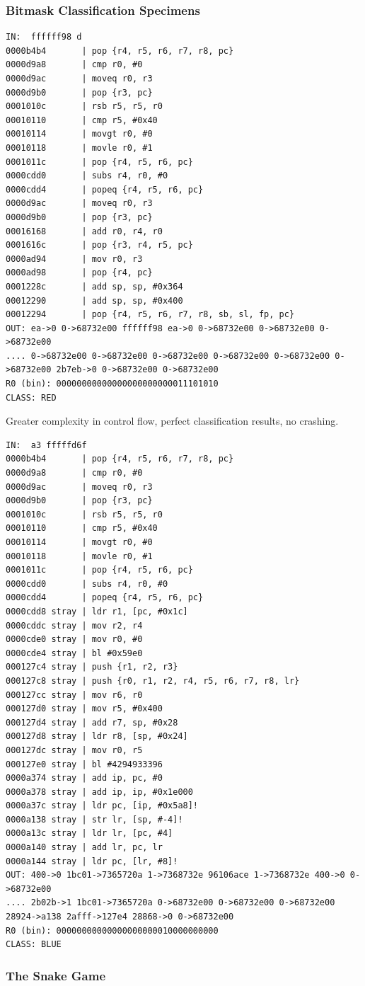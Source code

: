 \documentclass[11pt]{article}
\begin{document}
\subsubsection*{Bitmask Classification Specimens}
\label{sec:orgcdf7ec4}
\begin{verbatim}
IN:  ffffff98 d
0000b4b4       | pop {r4, r5, r6, r7, r8, pc}
0000d9a8       | cmp r0, #0
0000d9ac       | moveq r0, r3
0000d9b0       | pop {r3, pc}
0001010c       | rsb r5, r5, r0
00010110       | cmp r5, #0x40
00010114       | movgt r0, #0
00010118       | movle r0, #1
0001011c       | pop {r4, r5, r6, pc}
0000cdd0       | subs r4, r0, #0
0000cdd4       | popeq {r4, r5, r6, pc}
0000d9ac       | moveq r0, r3
0000d9b0       | pop {r3, pc}
00016168       | add r0, r4, r0
0001616c       | pop {r3, r4, r5, pc}
0000ad94       | mov r0, r3
0000ad98       | pop {r4, pc}
0001228c       | add sp, sp, #0x364
00012290       | add sp, sp, #0x400
00012294       | pop {r4, r5, r6, r7, r8, sb, sl, fp, pc}
OUT: ea->0 0->68732e00 ffffff98 ea->0 0->68732e00 0->68732e00 0->68732e00 
.... 0->68732e00 0->68732e00 0->68732e00 0->68732e00 0->68732e00 0->68732e00 2b7eb->0 0->68732e00 0->68732e00 
R0 (bin): 00000000000000000000000011101010
CLASS: RED
\end{verbatim}
Greater complexity in control flow, perfect classification results, no crashing.
\begin{verbatim}
IN:  a3 fffffd6f
0000b4b4       | pop {r4, r5, r6, r7, r8, pc}
0000d9a8       | cmp r0, #0
0000d9ac       | moveq r0, r3
0000d9b0       | pop {r3, pc}
0001010c       | rsb r5, r5, r0
00010110       | cmp r5, #0x40
00010114       | movgt r0, #0
00010118       | movle r0, #1
0001011c       | pop {r4, r5, r6, pc}
0000cdd0       | subs r4, r0, #0
0000cdd4       | popeq {r4, r5, r6, pc}
0000cdd8 stray | ldr r1, [pc, #0x1c]
0000cddc stray | mov r2, r4
0000cde0 stray | mov r0, #0
0000cde4 stray | bl #0x59e0
000127c4 stray | push {r1, r2, r3}
000127c8 stray | push {r0, r1, r2, r4, r5, r6, r7, r8, lr}
000127cc stray | mov r6, r0
000127d0 stray | mov r5, #0x400
000127d4 stray | add r7, sp, #0x28
000127d8 stray | ldr r8, [sp, #0x24]
000127dc stray | mov r0, r5
000127e0 stray | bl #4294933396
0000a374 stray | add ip, pc, #0
0000a378 stray | add ip, ip, #0x1e000
0000a37c stray | ldr pc, [ip, #0x5a8]!
0000a138 stray | str lr, [sp, #-4]!
0000a13c stray | ldr lr, [pc, #4]
0000a140 stray | add lr, pc, lr
0000a144 stray | ldr pc, [lr, #8]!
OUT: 400->0 1bc01->7365720a 1->7368732e 96106ace 1->7368732e 400->0 0->68732e00 
.... 2b02b->1 1bc01->7365720a 0->68732e00 0->68732e00 0->68732e00 28924->a138 2afff->127e4 28868->0 0->68732e00 
R0 (bin): 00000000000000000000010000000000
CLASS: BLUE
\end{verbatim}

\subsubsection*{The Snake Game}
\label{sec:org05521ca}
\end{document}
